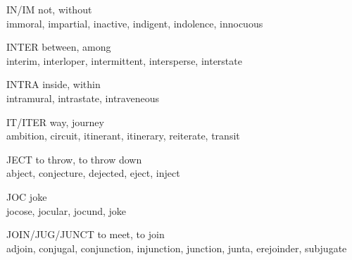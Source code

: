 \begin{flashcard}[Roots]{IN/IM}
not, without\\
\vspace{0.2in}
immoral, impartial, inactive, indigent, indolence, innocuous\\
\end{flashcard}

\begin{flashcard}[Roots]{INTER}
between, among\\
\vspace{0.2in}
interim, interloper, intermittent, intersperse, interstate\\
\end{flashcard}

\begin{flashcard}[Roots]{INTRA}
inside, within\\
\vspace{0.2in}
intramural, intrastate, intraveneous\\
\end{flashcard}

\begin{flashcard}[Roots]{IT/ITER}
way, journey\\
\vspace{0.2in}
ambition, circuit, itinerant, itinerary, reiterate, transit\\
\end{flashcard}

\begin{flashcard}[Roots]{JECT}
to throw, to throw down\\
\vspace{0.2in}
abject, conjecture, dejected, eject, inject\\
\end{flashcard}

\begin{flashcard}[Roots]{JOC}
joke\\
\vspace{0.2in}
jocose, jocular, jocund, joke\\
\end{flashcard}

\begin{flashcard}[Roots]{JOIN/JUG/JUNCT}
to meet, to join\\
\vspace{0.2in}
adjoin, conjugal, conjunction, injunction, junction, junta, erejoinder, subjugate\\
\end{flashcard}

